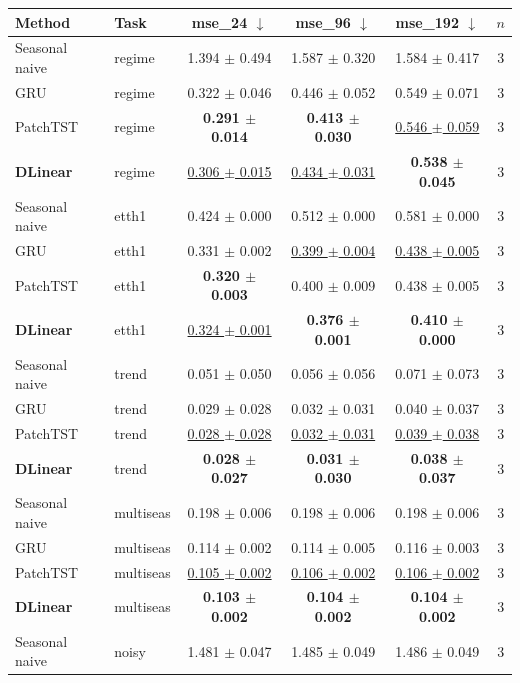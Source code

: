 \begin{tabular}{llcccc}
\toprule
Method & Task & mse\_24 $\downarrow$ & mse\_96 $\downarrow$ & mse\_192 $\downarrow$ & $n$ \\
\midrule
Seasonal naive & regime & 1.394 $\pm$ 0.494 & 1.587 $\pm$ 0.320 & 1.584 $\pm$ 0.417 & 3 \\
GRU & regime & 0.322 $\pm$ 0.046 & 0.446 $\pm$ 0.052 & 0.549 $\pm$ 0.071 & 3 \\
PatchTST & regime & \textbf{0.291 $\pm$ 0.014} & \textbf{0.413 $\pm$ 0.030} & \underline{0.546 $\pm$ 0.059} & 3 \\
\textbf{DLinear} & regime & \underline{0.306 $\pm$ 0.015} & \underline{0.434 $\pm$ 0.031} & \textbf{0.538 $\pm$ 0.045} & 3 \\
\midrule
Seasonal naive & etth1 & 0.424 $\pm$ 0.000 & 0.512 $\pm$ 0.000 & 0.581 $\pm$ 0.000 & 3 \\
GRU & etth1 & 0.331 $\pm$ 0.002 & \underline{0.399 $\pm$ 0.004} & \underline{0.438 $\pm$ 0.005} & 3 \\
PatchTST & etth1 & \textbf{0.320 $\pm$ 0.003} & 0.400 $\pm$ 0.009 & 0.438 $\pm$ 0.005 & 3 \\
\textbf{DLinear} & etth1 & \underline{0.324 $\pm$ 0.001} & \textbf{0.376 $\pm$ 0.001} & \textbf{0.410 $\pm$ 0.000} & 3 \\
\midrule
Seasonal naive & trend & 0.051 $\pm$ 0.050 & 0.056 $\pm$ 0.056 & 0.071 $\pm$ 0.073 & 3 \\
GRU & trend & 0.029 $\pm$ 0.028 & 0.032 $\pm$ 0.031 & 0.040 $\pm$ 0.037 & 3 \\
PatchTST & trend & \underline{0.028 $\pm$ 0.028} & \underline{0.032 $\pm$ 0.031} & \underline{0.039 $\pm$ 0.038} & 3 \\
\textbf{DLinear} & trend & \textbf{0.028 $\pm$ 0.027} & \textbf{0.031 $\pm$ 0.030} & \textbf{0.038 $\pm$ 0.037} & 3 \\
\midrule
Seasonal naive & multiseas & 0.198 $\pm$ 0.006 & 0.198 $\pm$ 0.006 & 0.198 $\pm$ 0.006 & 3 \\
GRU & multiseas & 0.114 $\pm$ 0.002 & 0.114 $\pm$ 0.005 & 0.116 $\pm$ 0.003 & 3 \\
PatchTST & multiseas & \underline{0.105 $\pm$ 0.002} & \underline{0.106 $\pm$ 0.002} & \underline{0.106 $\pm$ 0.002} & 3 \\
\textbf{DLinear} & multiseas & \textbf{0.103 $\pm$ 0.002} & \textbf{0.104 $\pm$ 0.002} & \textbf{0.104 $\pm$ 0.002} & 3 \\
\midrule
Seasonal naive & noisy & 1.481 $\pm$ 0.047 & 1.485 $\pm$ 0.049 & 1.486 $\pm$ 0.049 & 3 \\

\end{tabular}

